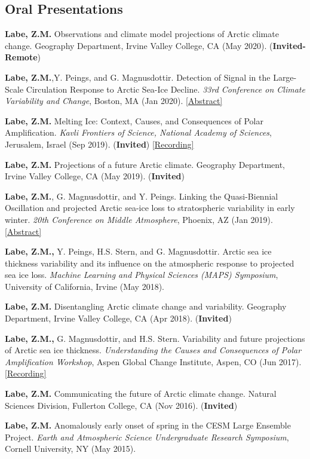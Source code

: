 \documentclass[margin,line,palatino,courier,10pt]{res}
\begin{document}
\begin{resume}
\section{\sc \textcolor{Cerulean}{\large{\textbf{Oral Presentations}}}}
\begin{etaremune}[leftmargin=0in,topsep=0in,parsep=0in]
\item \textbf{Labe, Z.M.} Observations and climate model projections of Arctic climate change. Geography Department, Irvine Valley College, CA (May 2020). (\textbf{Invited-Remote})
\item \textbf{Labe, Z.M.},Y. Peings, and G. Magnusdottir. Detection of Signal in the Large-Scale Circulation Response to Arctic Sea-Ice Decline. \textit{33rd Conference on Climate Variability and Change}, Boston, MA (Jan 2020). \href{https://ams.confex.com/ams/2020Annual/meetingapp.cgi/Paper/367289}{[Abstract]}
\item \textbf{Labe, Z.M.} Melting Ice: Context, Causes, and Consequences of Polar Amplification. \textit{Kavli Frontiers of Science, National Academy of Sciences}, Jerusalem, Israel (Sep 2019). (\textbf{Invited}) \href{https://vimeo.com/362912204}{[Recording]}
\item \textbf{Labe, Z.M.} Projections of a future Arctic climate. Geography Department, Irvine Valley College, CA (May 2019). (\textbf{Invited})
\item \textbf{Labe, Z.M.}, G. Magnusdottir, and Y. Peings. Linking the Quasi-Biennial Oscillation and projected Arctic sea-ice loss to stratospheric variability in early winter. \textit{20th Conference on Middle Atmosphere}, Phoenix, AZ (Jan 2019). \href{https://ams.confex.com/ams/2019Annual/meetingapp.cgi/Paper/352664}{[Abstract]}
\item \textbf{Labe, Z.M.,} Y. Peings, H.S. Stern, and G. Magnusdottir. Arctic sea ice thickness variability and its influence on the atmospheric response to projected sea ice loss. \textit{Machine Learning and Physical Sciences (MAPS) Symposium}, University of California, Irvine (May 2018). 
\item \textbf{Labe, Z.M.} Disentangling Arctic climate change and variability. Geography Department, Irvine Valley College, CA (Apr 2018). (\textbf{Invited})
\item \textbf{Labe, Z.M.,} G. Magnusdottir, and H.S. Stern. Variability and future projections of Arctic sea ice thickness. \textit{Understanding the Causes and Consequences of Polar Amplification Workshop}, Aspen Global Change Institute, Aspen, CO (Jun 2017). \href{https://www.agci.org/lib/17s1/variability-and-future-projections-arctic-sea-ice-thickness}{[Recording]}
\item \textbf{Labe, Z.M.} Communicating the future of Arctic climate change. Natural Sciences Division, Fullerton College, CA (Nov 2016). (\textbf{Invited})
\item \textbf{Labe, Z.M.} Anomalously early onset of spring in the CESM Large Ensemble Project. \textit{Earth and Atmospheric Science Undergraduate Research Symposium}, Cornell University, NY (May 2015). 


\end{etaremune}
\end{resume}
\end{document}
